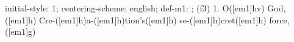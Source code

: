 initial-style: 1;
centering-scheme: english;
def-m1: \grealign;
(f3) 1. O([em1]hv) God,([em1]h) Cre-([em1]h)a-([em1]h)tion's([em1]h) se-([em1]h)cret([em1]h) force,([em1]g)